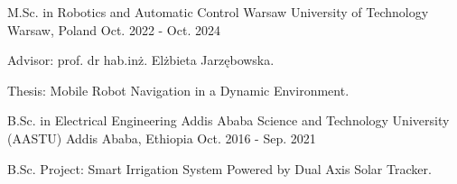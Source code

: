 

\begin{cventries}

  \cventry
    {M.Sc. in Robotics and Automatic Control} %
    {Warsaw University of Technology} %
    {Warsaw, Poland} %
    {Oct. 2022 - Oct. 2024} %
    {
      \begin{cvitems} %
        \item {Advisor: prof. dr hab.in{\.z}. El{\.z}bieta Jarz\k{e}bowska.}
        \item {Thesis: Mobile Robot Navigation in a Dynamic Environment.}
      \end{cvitems}
    }

  \cventry
    {B.Sc. in Electrical Engineering} %
    {Addis Ababa Science and Technology University (AASTU)} %
    {Addis Ababa, Ethiopia} %
    {Oct. 2016 - Sep. 2021} %
    {
      \begin{cvitems} %
        \item {B.Sc. Project: Smart Irrigation System Powered by Dual Axis Solar Tracker.}
      \end{cvitems}
    }  

\end{cventries}
